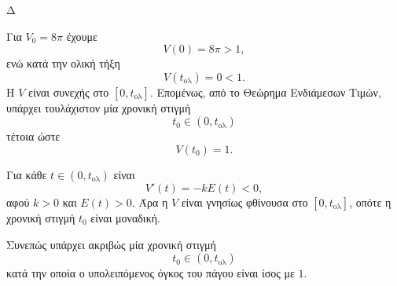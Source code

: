 \begin{thema}{Δ}
\begin{erwthma}
\item Για $V_0=8\pi$ έχουμε
\[
V(0)=8\pi>1,
\]
ενώ κατά την ολική τήξη
\[
V(t_{\mathrm{ολ}})=0<1.
\]
Η $V$ είναι συνεχής στο $[0,t_{\mathrm{ολ}}]$. Επομένως, από το Θεώρημα Ενδιάμεσων Τιμών, υπάρχει τουλάχιστον μία χρονική στιγμή
\[
t_0\in(0,t_{\mathrm{ολ}})
\]
τέτοια ώστε
\[
V(t_0)=1.
\]

Για κάθε $t\in(0,t_{\mathrm{ολ}})$ είναι
\[
V'(t)=-kE(t)<0,
\]
αφού $k>0$ και $E(t)>0$. Άρα η $V$ είναι γνησίως φθίνουσα στο $[0,t_{\mathrm{ολ}}]$, οπότε η χρονική στιγμή $t_0$ είναι μοναδική.

Συνεπώς υπάρχει ακριβώς μία χρονική στιγμή
\[
{t_0\in(0,t_{\mathrm{ολ}})}
\]
κατά την οποία ο υπολειπόμενος όγκος του πάγου είναι ίσος με $1$.
\end{erwthma}
\end{thema}


